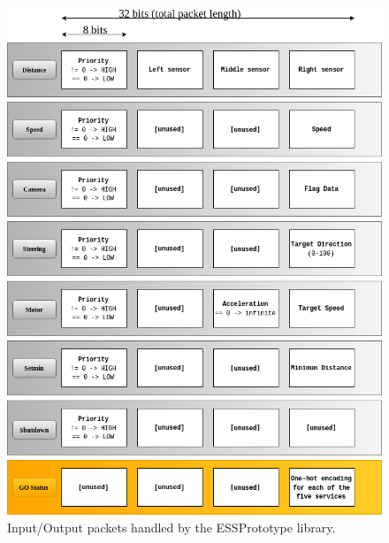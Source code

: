 \documentclass[11pt, titlepage]{article} %
\begin{document}
\begin{figure}[H]
	\centering
   	\includegraphics[scale=0.5]{packets.png}
   	\caption{Input/Output packets handled by the ESSPrototype library.}
    \label{fig:packets}
\end{figure}
\end{document}
